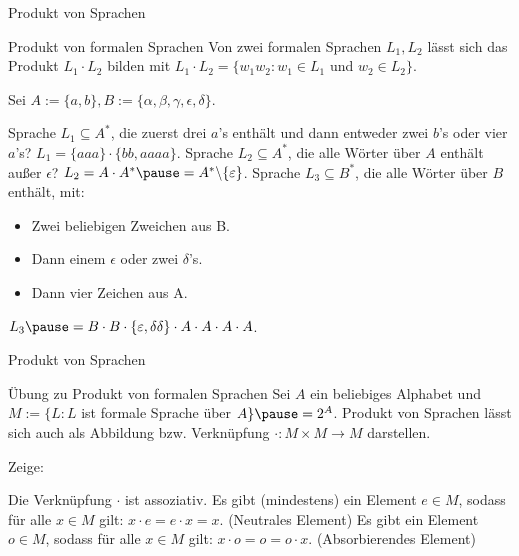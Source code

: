 \begin{frame}{Produkt von Sprachen}
	\begin{block}{Produkt von formalen Sprachen}
		Von zwei formalen Sprachen $L_1, L_2$ \pause lässt sich das Produkt \pause $L_1 \cdot L_2$ \pause bilden mit \pause $L_1 \cdot L_2 = \{w_1w_2 : w_1 \in L_1 $ und $w_2 \in L_2 \}$.
	\end{block}

	Sei $A := \{a, b\}, B := \{\alpha, \beta, \gamma, \epsilon, \delta\}$.
	
	\begin{itemize}
		\pitem Sprache $L_1 \subseteq A^*$, die zuerst drei $a$'s enthält und dann entweder zwei $b$'s oder vier $a$'s? $L_1 = \{aaa\}\cdot\{bb,aaaa\}$.
		\pitem Sprache $L_2 \subseteq A^*$, die alle Wörter über $A$ enthält außer $\epsilon$? \pause $L_2 = A \cdot A^* \pause = A^* \backslash \{\epsilon\}$.
		\pitem Sprache $L_3 \subseteq B^*$, die alle Wörter über $B$ enthält, mit:
		\begin{itemize}
			\p\item Zwei beliebigen Zweichen aus B.
			\p\item Dann einem $\epsilon$ oder zwei $\delta$'s.
			\p\item Dann vier Zeichen aus A.
		\end{itemize}
		\pitem $L_3 \p = B \cdot B \cdot \{\epsilon, \delta\delta\} \cdot A \cdot A \cdot A \cdot A$.
	\end{itemize}
\end{frame}

\begin{frame}{Produkt von Sprachen}	
	\begin{taskblock}{Übung zu Produkt von formalen Sprachen}
		Sei $A$ ein beliebiges Alphabet und $M := \{L : L $ ist formale Sprache über $A \} \pause = 2^A$. \pause Produkt von Sprachen lässt sich auch als Abbildung bzw. Verknüpfung $\cdot : M \times M \rightarrow M$ darstellen.
		
		Zeige: 
		\begin{itemize}
			\pitem Die Verknüpfung $\cdot$ ist assoziativ.
			\pitem Es gibt (mindestens) ein Element $e \in M$, sodass für alle $x \in M$ gilt: $x \cdot e = e \cdot x = x$. (Neutrales Element)
			\pitem Es gibt ein Element $o \in M$, sodass für alle $x \in M$ gilt: $x \cdot o = o = o \cdot x$. (Absorbierendes Element)
		\end{itemize}
	\end{taskblock}
\end{frame}

